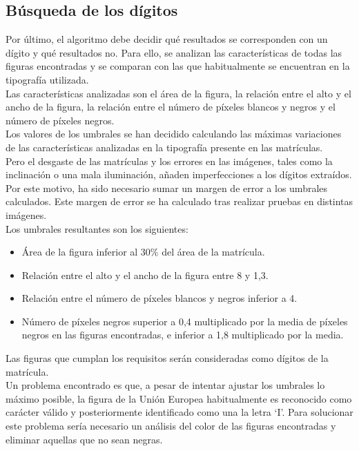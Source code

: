 \subsection{Búsqueda de los dígitos}
Por último, el algoritmo debe decidir qué resultados se corresponden con un dígito y qué resultados no. Para ello, se analizan las características de todas las figuras encontradas y se comparan con las que habitualmente se encuentran en la tipografía utilizada.\\

Las características analizadas son el área de la figura, la relación entre el alto y el ancho de la figura, la relación entre el número de píxeles blancos y negros y el número de píxeles negros.\\

Los valores de los umbrales se han decidido calculando las máximas variaciones de las características analizadas en la tipografía presente en las matrículas.\\

Pero el desgaste de las matrículas y los errores en las imágenes, tales como la inclinación o una mala iluminación, añaden imperfecciones a los dígitos extraídos. Por este motivo, ha sido necesario sumar un margen de error a los umbrales calculados. Este margen de error se ha calculado tras realizar pruebas en distintas imágenes.\\

Los umbrales resultantes son los siguientes:

\begin{itemize}
\item Área de la figura inferior al 30\% del área de la matrícula. 
\item Relación entre el alto y el ancho de la figura entre 8 y 1,3.
\item Relación entre el número de píxeles blancos y negros inferior a 4.
\item Número de píxeles negros superior a 0,4 multiplicado por la media de píxeles negros en las figuras encontradas, e inferior a 1,8 multiplicado por la media.
\end{itemize}

Las figuras que cumplan los requisitos serán consideradas como dígitos de la matrícula.\\

Un problema encontrado es que, a pesar de intentar ajustar los umbrales lo máximo posible, la figura de la Unión Europea habitualmente es reconocido como carácter válido y posteriormente identificado como una la letra `I'. Para solucionar este problema sería necesario un análisis del color de las figuras encontradas y eliminar aquellas que no sean negras.

